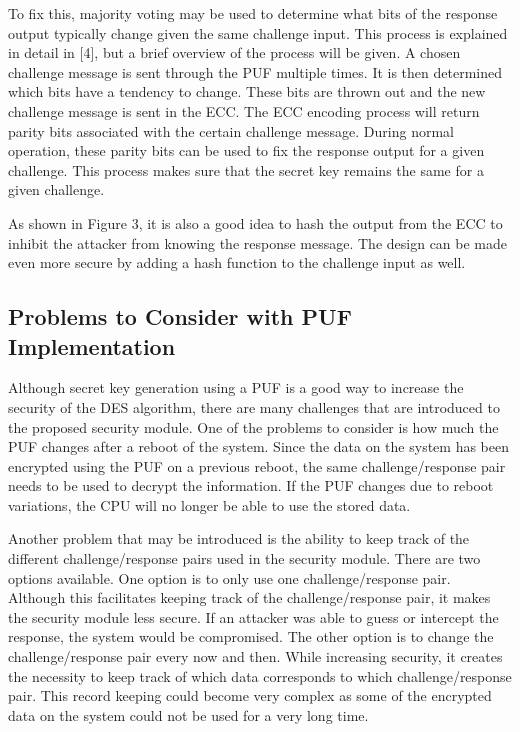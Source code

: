 \documentclass[letterpaper, 10 pt, conference]{ieeeconf}  %
\begin{document}
To fix this, majority voting may be used to determine what bits of the response output typically change given the same challenge input.  This process is explained in detail in [4], but a brief overview of the process will be given.  A chosen challenge message is sent through the PUF multiple times.  It is then determined which bits have a tendency to change.  These bits are thrown out and the new challenge message is sent in the ECC.  The ECC encoding process will return parity bits associated with the certain challenge message.  During normal operation, these parity bits can be used to fix the response output for a given challenge.  This process makes sure that the secret key remains the same for a given challenge.

As shown in Figure 3, it is also a good idea to hash the output from the ECC to inhibit the attacker from knowing the response message.  The design can be made even more secure by adding a hash function to the challenge input as well.  

\subsection{Problems to Consider with PUF Implementation}

Although secret key generation using a PUF is a good way to increase the security of the DES algorithm, there are many challenges that are introduced to the proposed security module.  One of the problems to consider is how much the PUF changes after a reboot of the system.  Since the data on the system has been encrypted using the PUF on a previous reboot, the same challenge/response pair needs to be used to decrypt the information.  If the PUF changes due to reboot variations, the CPU will no longer be able to use the stored data.

Another problem that may be introduced is the ability to keep track of the different challenge/response pairs used in the security module.  There are two options available.  One option is to only use one challenge/response pair.  Although this facilitates keeping track of the challenge/response pair, it makes the security module less secure.  If an attacker was able to guess or intercept the response, the system would be compromised.  The other option is to change the challenge/response pair every now and then.  While increasing security, it creates the necessity to keep track of which data corresponds to which challenge/response pair.  This record keeping could become very complex as some of the encrypted data on the system could not be used for a very long time.
\end{document}
